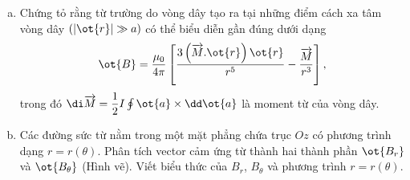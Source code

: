 \begin{vd}
\begin{enumerate}[1)]
\begin{center}
        \end{center}
        \begin{enumerate}[a)]
            \item Chứng tỏ rằng từ trường do vòng dây tạo ra tại những điểm cách xa tâm vòng dây $\left( \left| {\ot{r}} \right| \gg a \right)$ có thể biểu diễn gần đúng dưới dạng \[\ot{B}=\dfrac{{{\mu }_{0}}}{4\pi }\left[ \dfrac{3\left( \overrightarrow{M}.\ot{r} \right)\ot{r}}{{{r}^{5}}}-\dfrac{\overrightarrow{M}}{{{r}^{3}}} \right],\] trong đó $\di \overrightarrow{M}=\dfrac{1}{2}I\oint{\ot{a}\times \dd\ot{a}}$ là moment từ của vòng dây.
            \item Các đường sức từ nằm trong một mặt phẳng chứa trục $Oz$ có phương trình dạng $r=r\left( \theta  \right)$. Phân tích vector cảm ứng từ thành hai thành phần ${{\ot{B_{r}}}}$ và ${{\ot{B_{\theta }}}}$ (Hình vẽ). Viết biểu thức của ${{B}_{r}}$, ${{B}_{\theta }}$ và phương trình $r=r\left( \theta  \right)$.
            \begin{center}
                


\begin{tikzpicture}[x=0.75pt,y=0.75pt,yscale=-1,xscale=1]


\end{tikzpicture}
\end{center}
\end{enumerate}
\end{enumerate}
\end{vd}
